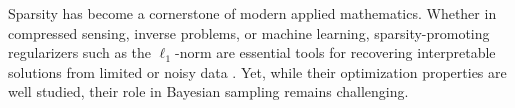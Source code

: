 \documentclass[11pt, twoside]{report}
\begin{document}

Sparsity has become a cornerstone of modern applied mathematics.
Whether in compressed sensing, inverse problems, or machine learning,
sparsity-promoting regularizers such as the $\ell_1$-norm are essential
tools for recovering interpretable solutions from limited or noisy data
\cite{anha,bach2012optimization}. Yet, while their optimization properties are well studied, their role in Bayesian sampling remains challenging.
\end{document}
